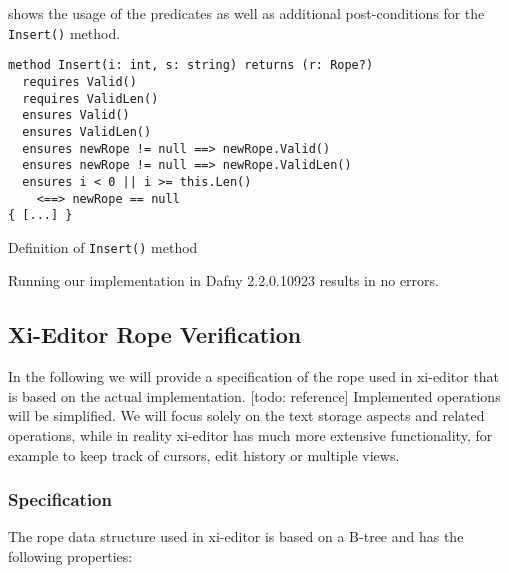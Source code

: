  shows the usage of the predicates as well as additional post-conditions for the \texttt{Insert()} method.

\begin{listing}[h!]
\begin{verbatim}
method Insert(i: int, s: string) returns (r: Rope?)
  requires Valid()
  requires ValidLen()
  ensures Valid()
  ensures ValidLen()
  ensures newRope != null ==> newRope.Valid()
  ensures newRope != null ==> newRope.ValidLen()
  ensures i < 0 || i >= this.Len() 
    <==> newRope == null
{ [...] }
\end{verbatim}
    \caption{Definition of \texttt{Insert()} method}
    \label{lst:insert}
\end{listing}

Running our implementation in Dafny 2.2.0.10923 results in no errors.


\subsection{Xi-Editor Rope Verification}

In the following we will provide a specification of the rope used in xi-editor that is based on the actual implementation. [todo: reference]
Implemented operations will be simplified.
We will focus solely on the text storage aspects and related operations, while in reality xi-editor has much more extensive functionality, for example to keep track of cursors, edit history or multiple views.

\subsubsection{Specification}

The rope data structure used in xi-editor is based on a B-tree and has the following properties:
  
